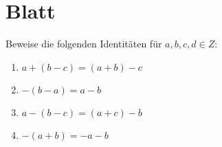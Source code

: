 \section{Blatt}


\begin{aufg}[6 Punkte]
Beweise die folgenden Identit\"aten f\"ur $a,b,c,d \in Z$:
\begin{enumerate}[label=$\mathrm{(\roman*)}$, ref=$\mathrm{\roman*}$]
\item $a+(b-c)=(a+b)-c$
\item $-(b-a)=a-b$
\item $a-(b-c)=(a+c)-b$
\item $-(a+b)=-a-b$
\end{enumerate}
\end{aufg}

\bigskip

